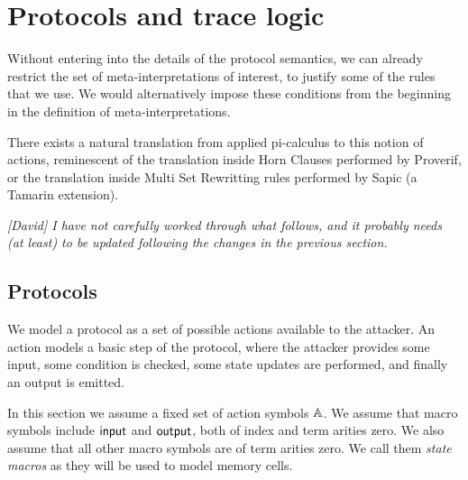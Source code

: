 \section{Protocols and trace logic}

Without entering into the details of the protocol semantics, we can already
restrict the set of meta-interpretations of interest, to justify some of the
rules that we use. We would alternatively impose these conditions from the
beginning in the definition of meta-interpretations.

There exists a natural translation from applied pi-calculus to this notion of 
actions, reminescent of the translation inside Horn Clauses performed by 
Proverif, or the translation inside Multi Set Rewritting rules performed by 
Sapic (a Tamarin extension).

\emph{[David] I have not carefully worked through what follows, and it
probably needs (at least) to be updated following the changes in the previous
section.}

\subsection{Protocols}

We  model a protocol as a set of possible actions available to the
attacker. An action models a basic step of the protocol, where
the attacker provides some input, some condition is checked, some
state updates are performed, and finally an output is emitted.

In this section we assume a fixed set of action symbols $\mathbb{A}$.
We assume that macro symbols include $\textsf{input}$ and $\textsf{output}$,
both of index and term arities zero.
We also assume that all other macro symbols are of term arities zero.
We call them \emph{state macros} as they will be used to model memory cells.

